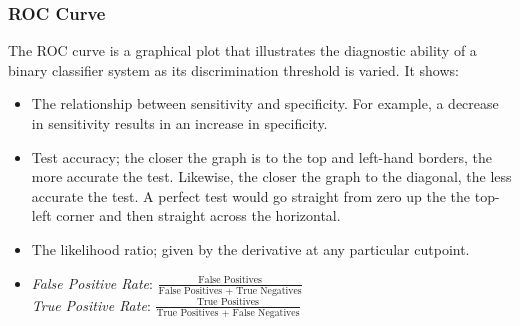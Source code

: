 \documentclass[english]{latex4ei/latex4ei_sheet}
\begin{document}
\begin{sectionbox}
\subsubsection{ROC Curve}
The ROC curve is a graphical plot that illustrates the diagnostic ability of a binary classifier system as its discrimination threshold is varied. It shows:
\begin{itemize}
    \item The relationship between sensitivity and specificity. For example, a decrease in sensitivity results in an increase in specificity.
    \item Test accuracy; the closer the graph is to the top and left-hand borders, the more accurate the test. Likewise, the closer the graph to the diagonal, the less accurate the test. A perfect test would go straight from zero up the the top-left corner and then straight across the horizontal.
    \item The likelihood ratio; given by the derivative at any particular cutpoint.
    \item \emph{False Positive Rate}: $\frac{\text{False Positives}}{\text{False Positives + True Negatives}}$\\
    \emph{True Positive Rate}: $\frac{\text{True Positives}}{\text{True Positives + False Negatives}}$
\end{itemize}
\end{sectionbox}
\end{document}
